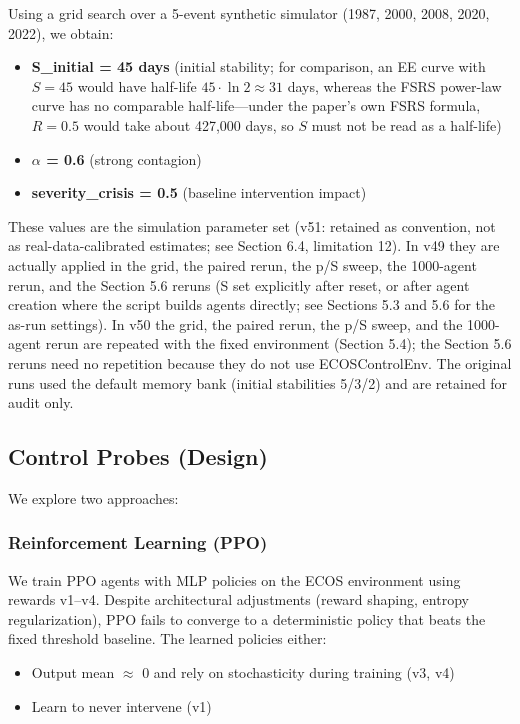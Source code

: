 \documentclass[11pt]{article}
\begin{document}
Using a grid search over a 5-event synthetic simulator (1987, 2000, 2008, 2020, 2022), we obtain:

\begin{itemize}
\item \textbf{S\_initial = 45 days} (initial stability; for comparison, an EE curve with $S=45$ would have half-life $45 \cdot \ln 2 \approx 31$ days, whereas the FSRS power-law curve has no comparable half-life---under the paper's own FSRS formula, $R=0.5$ would take about 427,000 days, so $S$ must not be read as a half-life)
\item \textbf{$\alpha$ = 0.6} (strong contagion)
\item \textbf{severity\_crisis = 0.5} (baseline intervention impact)
\end{itemize}

These values are the simulation parameter set (v51: retained as convention, not as real-data-calibrated estimates; see Section 6.4, limitation 12). In v49 they are actually applied in the grid, the paired rerun, the p/S sweep, the 1000-agent rerun, and the Section 5.6 reruns (S set explicitly after reset, or after agent creation where the script builds agents directly; see Sections 5.3 and 5.6 for the as-run settings). In v50 the grid, the paired rerun, the p/S sweep, and the 1000-agent rerun are repeated with the fixed environment (Section 5.4); the Section 5.6 reruns need no repetition because they do not use ECOSControlEnv. The original runs used the default memory bank (initial stabilities 5/3/2) and are retained for audit only.

\subsection{Control Probes (Design)}
We explore two approaches:

\subsubsection{Reinforcement Learning (PPO)}
We train PPO agents with MLP policies on the ECOS environment using rewards v1--v4. Despite architectural adjustments (reward shaping, entropy regularization), PPO fails to converge to a deterministic policy that beats the fixed threshold baseline. The learned policies either:

\begin{itemize}
\item Output mean $\approx$ 0 and rely on stochasticity during training (v3, v4)
\item Learn to never intervene (v1)
\end{itemize}
\end{document}
